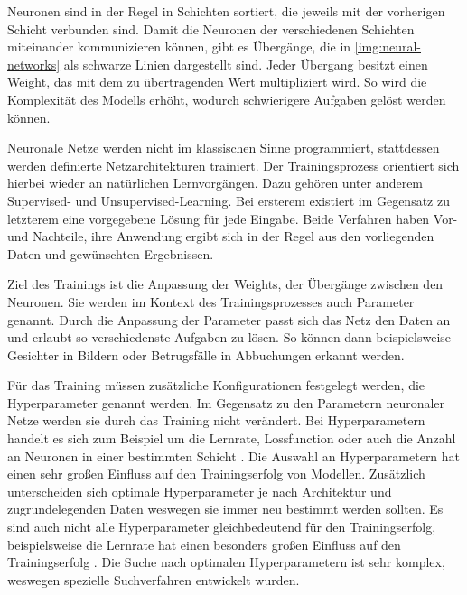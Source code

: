 Neuronen sind in der Regel in Schichten sortiert, die jeweils mit der vorherigen Schicht verbunden sind.
Damit die Neuronen der verschiedenen Schichten miteinander kommunizieren können, gibt es Übergänge, die in \cref{img:neural-networks} als schwarze Linien dargestellt sind.
Jeder Übergang besitzt einen Weight, das mit dem zu übertragenden Wert multipliziert wird.
So wird die Komplexität des Modells erhöht, wodurch schwierigere Aufgaben gelöst werden können.
\newline

Neuronale Netze werden nicht im klassischen Sinne programmiert, stattdessen werden definierte Netzarchitekturen trainiert.
Der Trainingsprozess orientiert sich hierbei wieder an natürlichen Lernvorgängen.
Dazu gehören unter anderem Supervised- und Unsupervised-Learning.
Bei ersterem existiert im Gegensatz zu letzterem eine vorgegebene Lösung für jede Eingabe.
Beide Verfahren haben Vor- und Nachteile, ihre Anwendung ergibt sich in der Regel aus den vorliegenden Daten und gewünschten Ergebnissen.

Ziel des Trainings ist die Anpassung der Weights, der Übergänge zwischen den Neuronen.
Sie werden im Kontext des Trainingsprozesses auch Parameter genannt.
Durch die Anpassung der Parameter passt sich das Netz den Daten an und erlaubt so verschiedenste Aufgaben zu lösen.
So können dann beispielsweise Gesichter in Bildern oder Betrugsfälle in Abbuchungen erkannt werden.
\newline

Für das Training müssen zusätzliche Konfigurationen festgelegt werden, die Hyperparameter genannt werden.
Im Gegensatz zu den Parametern neuronaler Netze werden sie durch das Training nicht verändert.
Bei Hyperparametern handelt es sich zum Beispiel um die Lernrate, Lossfunction oder auch die Anzahl an Neuronen in einer bestimmten Schicht \cite{hyperparameters-gan-using-genetic-algorithm}.
Die Auswahl an Hyperparametern hat einen sehr großen Einfluss auf den Trainingserfolg von Modellen.
Zusätzlich unterscheiden sich optimale Hyperparameter je nach Architektur und zugrundelegenden Daten weswegen sie immer neu bestimmt werden sollten. 
Es sind auch nicht alle Hyperparameter gleichbedeutend für den Trainingserfolg, beispielsweise die Lernrate hat einen besonders großen Einfluss auf den Trainingserfolg \cite{learning-rate-most-important}.
Die Suche nach optimalen Hyperparametern ist sehr komplex, weswegen spezielle Suchverfahren entwickelt wurden. 

